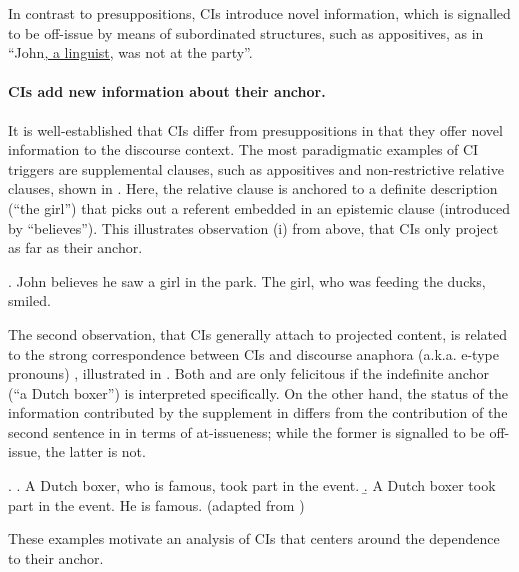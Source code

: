 
In contrast to
presuppositions, CIs introduce novel information, which is signalled to be
off-issue by means of subordinated structures, such as appositives, as in
``John\underline{, a linguist,} was not at the party''.


\paragraph{CIs add new information about their anchor.} It is
well-established that CIs differ from presuppositions in that they offer
novel information to the discourse context. The most paradigmatic examples
of CI triggers are supplemental clauses, such as appositives and
non-restrictive relative clauses, shown in \Next.  Here, the relative clause
is anchored to a definite description (``the girl'') that picks out
a referent embedded in an epistemic clause (introduced by ``believes'').
This illustrates observation (i) from above, that CIs only project as far as
their anchor. 

\ex. John believes he saw a girl in the park. The girl, who was feeding the
  ducks, smiled.

The second observation, that CIs generally attach to projected content, is
related to the strong correspondence between CIs and discourse anaphora
(a.k.a.  e-type pronouns) \citep{nouwen2007appositives-short}, illustrated
in \Next. Both \Next[a] and \Next[b] are only felicitous if the indefinite
anchor (``a Dutch boxer'') is interpreted specifically. On the other hand,
the status of the information contributed by the supplement in \Next[a] differs
from the contribution of the second sentence in \Next[b] in terms of
at-issueness; while the former is signalled to be off-issue, the latter is
not.

\ex. \a. A Dutch boxer, who is famous, took part in the event.
\b. A Dutch boxer took part in the event. He is famous.
  \hfill(adapted from \citep{nouwen2007appositives-short})

These examples motivate an analysis of CIs that centers around the
dependence to their anchor.



